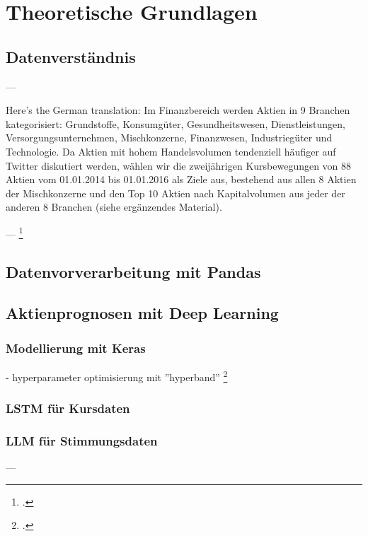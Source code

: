 \newpage
\section{Theoretische Grundlagen}\label{sec:theorie}



\subsection{Datenverständnis}\label{sec:theorie_data_understanding}

---

Here's the German translation:
Im Finanzbereich werden Aktien in 9 Branchen kategorisiert: Grundstoffe, Konsumgüter, Gesundheitswesen, Dienstleistungen, Versorgungsunternehmen, Mischkonzerne, Finanzwesen, Industriegüter und Technologie. Da Aktien mit hohem Handelsvolumen tendenziell häufiger auf Twitter diskutiert werden, wählen wir die zweijährigen Kursbewegungen von 88 Aktien vom 01.01.2014 bis 01.01.2016 als Ziele aus, bestehend aus allen 8 Aktien der Mischkonzerne und den Top 10 Aktien nach Kapitalvolumen aus jeder der anderen 8 Branchen (siehe ergänzendes Material).

---
\footcite[Kap. 3]{xu2018StockMovement}

\subsection{Datenvorverarbeitung mit Pandas}\label{sec:theorie_pandas}


\subsection{Aktienprognosen mit Deep Learning}\label{sec:theorie_dl}

\subsubsection{Modellierung mit Keras}\label{sec:theorie_keras}
- hyperparameter optimisierung mit ''hyperband''
\footcite{li2018hyperband}

\subsubsection{LSTM für Kursdaten}\label{sec:theorie_lstm}

\subsubsection{LLM für Stimmungsdaten}\label{sec:theorie_llm}
---

